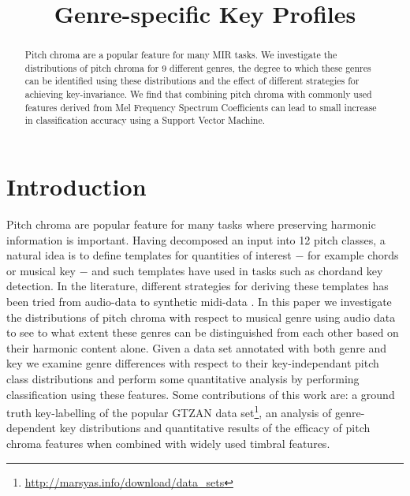 \documentclass{article}
\title{Genre-specific Key Profiles}
\begin{document}
%
\maketitle
%
\begin{abstract}
Pitch chroma are a popular feature for many MIR tasks. We investigate the distributions of pitch chroma for 9 different genres, the degree to which these genres can be identified using these distributions and the effect of different strategies for achieving key-invariance. We find that combining pitch chroma with commonly used features derived from Mel Frequency Spectrum Coefficients can lead to small increase in classification accuracy using a Support Vector Machine.
\end{abstract}
%
\section{Introduction}\label{sec:introduction}

Pitch chroma are popular feature for many tasks where preserving harmonic information is important. Having decomposed an input into 12 pitch classes, a natural idea is to define templates for quantities of interest $-$ for example chords or musical key $-$ and such templates have used in tasks such as chord\cite{fujishima_realtime_1999}and key detection\cite{temperley_pitch-class_2008}.  In the literature, different strategies for deriving these templates has been tried from audio-data \cite{??} to synthetic midi-data \cite{??}. In this paper we investigate the distributions of pitch chroma with respect to musical genre using audio data to see to what extent these genres can be distinguished from each other based on their harmonic content alone. Given a data set annotated with both genre and key we examine genre differences with respect to their key-independant pitch class distributions and perform some quantitative analysis by performing classification using these features. Some contributions of this work are: a ground truth key-labelling of the popular GTZAN data set\footnote{\url{http://marsyas.info/download/data_sets}}, an analysis of genre-dependent key distributions and quantitative results of the efficacy of pitch chroma features when combined with widely used timbral features.
\end{document}
